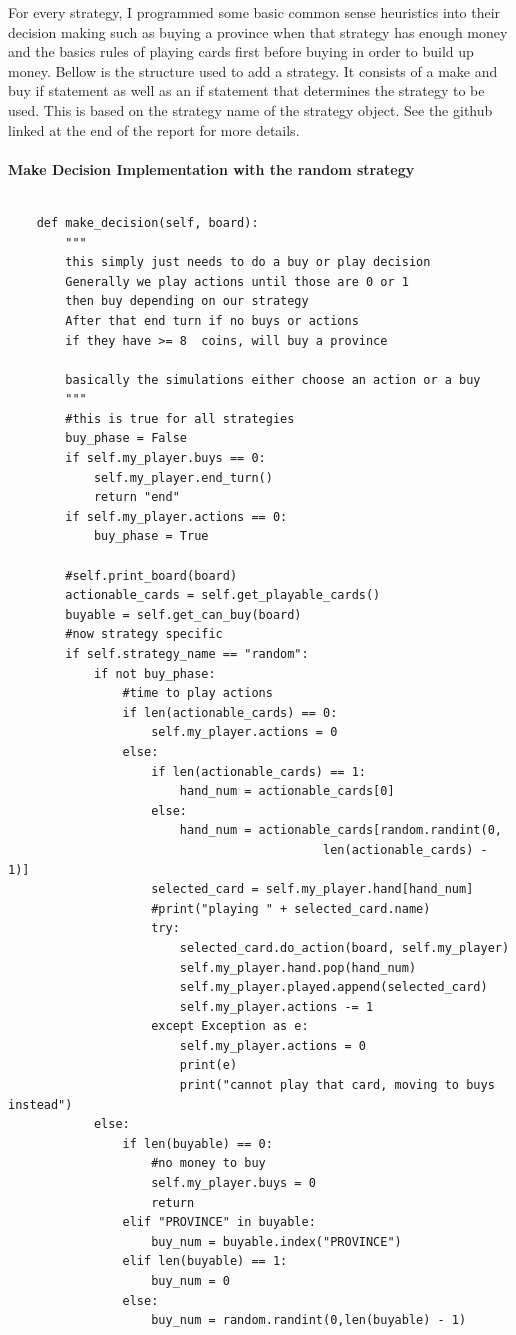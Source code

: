 \documentclass[11pt, oneside]{article}   	%
\begin{document}
For every strategy, I programmed some basic common sense heuristics into their decision making such as buying a province when that strategy has enough money and the basics rules of playing cards first before buying in order to build up money. Bellow is the structure used to add a strategy. It consists of a make and buy if statement as well as an if statement that determines the strategy to be used. This is based on the strategy name of the strategy object. See the github linked at the end of the report for more details.
\\
\\
\textbf{Make Decision Implementation with the random strategy}
\begin{verbatim}

    def make_decision(self, board):
        """
        this simply just needs to do a buy or play decision
        Generally we play actions until those are 0 or 1
        then buy depending on our strategy
        After that end turn if no buys or actions
        if they have >= 8  coins, will buy a province

        basically the simulations either choose an action or a buy
        """
        #this is true for all strategies
        buy_phase = False
        if self.my_player.buys == 0:
            self.my_player.end_turn()
            return "end"
        if self.my_player.actions == 0:
            buy_phase = True

        #self.print_board(board)
        actionable_cards = self.get_playable_cards()
        buyable = self.get_can_buy(board)
        #now strategy specific
        if self.strategy_name == "random":
            if not buy_phase:
                #time to play actions
                if len(actionable_cards) == 0:
                    self.my_player.actions = 0
                else:
                    if len(actionable_cards) == 1:
                        hand_num = actionable_cards[0]
                    else:
                        hand_num = actionable_cards[random.randint(0,
                        					len(actionable_cards) - 1)]
                    selected_card = self.my_player.hand[hand_num]
                    #print("playing " + selected_card.name)
                    try:
                        selected_card.do_action(board, self.my_player)
                        self.my_player.hand.pop(hand_num) 
                        self.my_player.played.append(selected_card)
                        self.my_player.actions -= 1
                    except Exception as e:
                        self.my_player.actions = 0
                        print(e)
                        print("cannot play that card, moving to buys instead")
            else:
                if len(buyable) == 0:
                    #no money to buy
                    self.my_player.buys = 0
                    return
                elif "PROVINCE" in buyable:
                    buy_num = buyable.index("PROVINCE")
                elif len(buyable) == 1:
                    buy_num = 0
                else:
                    buy_num = random.randint(0,len(buyable) - 1)


\end{verbatim}
\end{document}
